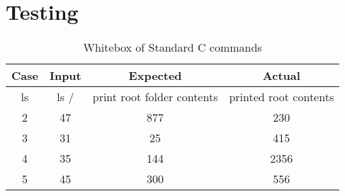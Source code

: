 \chapter{Testing}

\begin{table}[ht]
\caption{Whitebox of Standard C commands}
\centering
\begin{tabular}{c c c c}
\hline
\hline %
Case & Input & Expected & Actual \\
[0.5ex]
\hline
ls & ls / & print root folder contents & printed root contents
\\
2 & 47 & 877 & 230
\\
3 & 31 & 25 & 415
\\
4 & 35 & 144 & 2356
\\
5 & 45 & 300 & 556
\\
[1ex]
\hline
\end{tabular}
\label{table:nonlin}
\end{table}